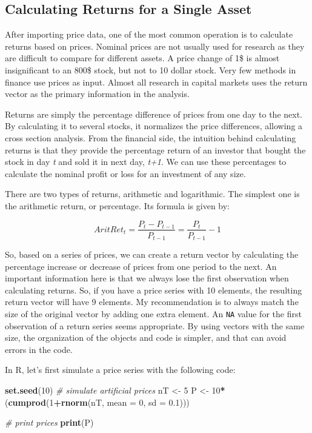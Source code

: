 \documentclass[11pt,]{book}
\newenvironment{Shaded}{\begin{snugshade}}{\end{snugshade}}
\newcommand{\KeywordTok}[1]{\textcolor[rgb]{0.27,0.27,0.27}{\textbf{#1}}}
\newcommand{\DataTypeTok}[1]{\textcolor[rgb]{0.27,0.27,0.27}{#1}}
\newcommand{\DecValTok}[1]{\textcolor[rgb]{0.06,0.06,0.06}{#1}}
\newcommand{\FloatTok}[1]{\textcolor[rgb]{0.06,0.06,0.06}{#1}}
\newcommand{\StringTok}[1]{\textcolor[rgb]{0.5,0.5,0.5}{#1}}
\newcommand{\CommentTok}[1]{\textcolor[rgb]{0.56,0.35,0.01}{\textit{#1}}}
\newcommand{\OperatorTok}[1]{\textcolor[rgb]{0.81,0.36,0.00}{\textbf{#1}}}
\newcommand{\NormalTok}[1]{#1}
\begin{document}
\subsection{Calculating Returns for a Single
Asset}\label{calculating-returns-for-a-single-asset}

After importing price data, one of the most common operation is to
calculate returns based on prices. Nominal prices are not usually used
for research as they are difficult to compare for different assets. A
price change of 1\$ is almost insignificant to an 800\$ stock, but not
to 10 dollar stock. Very few methods in finance use prices as input.
Almost all research in capital markets uses the return vector as the
primary information in the analysis.

Returns are simply the percentage difference of prices from one day to
the next. By calculating it to several stocks, it normalizes the price
differences, allowing a cross section analysis. From the financial side,
the intuition behind calculating returns is that they provide the
percentage return of an investor that bought the stock in day \emph{t}
and sold it in next day, \emph{t+1}. We can use these percentages to
calculate the nominal profit or loss for an investment of any size.

There are two types of returns, arithmetic and logarithmic. The simplest
one is the arithmetic return, or percentage. Its formula is given by:

\[AritRet_t = \frac{P_t-P_{t-1}}{P_{t-1}} =\frac{P_t}{P_{t-1}}-1 \]

So, based on a series of prices, we can create a return vector by
calculating the percentage increase or decrease of prices from one
period to the next. An important information here is that we always lose
the first observation when calculating returns. So, if you have a price
series with 10 elements, the resulting return vector will have 9
elements. My recommendation is to always match the size of the original
vector by adding one extra element. An \texttt{NA} value for the first
observation of a return series seems appropriate. By using vectors with
the same size, the organization of the objects and code is simpler, and
that can avoid errors in the code.

In R, let's first simulate a price series with the following code:

\begin{Shaded}
\begin{Highlighting}[]
\KeywordTok{set.seed}\NormalTok{(}\DecValTok{10}\NormalTok{)}
\CommentTok{# simulate artificial prices}
\NormalTok{nT <-}\StringTok{ }\DecValTok{5}
\NormalTok{P <-}\StringTok{ }\DecValTok{10}\OperatorTok{*}\NormalTok{(}\KeywordTok{cumprod}\NormalTok{(}\DecValTok{1}\OperatorTok{+}\KeywordTok{rnorm}\NormalTok{(nT, }
                         \DataTypeTok{mean =} \DecValTok{0}\NormalTok{, }
                         \DataTypeTok{sd =} \FloatTok{0.1}\NormalTok{)))}

\CommentTok{# print prices}
\KeywordTok{print}\NormalTok{(P)}
\end{Highlighting}
\end{Shaded}
\end{document}

